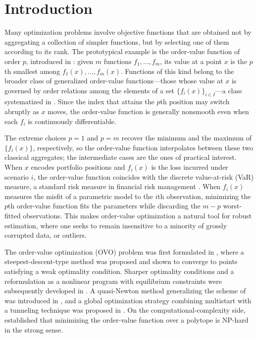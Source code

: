 \documentclass[11pt]{article}
\begin{document}
\section{Introduction} \label{sec:intro}

Many optimization problems involve objective functions that are obtained not
by aggregating a collection of simpler functions, but by selecting one of them
according to its rank. The prototypical example is the order-value function of
order $p$, introduced in \cite{dunder1,dunder2}: given $m$ functions
$f_1,\dots,f_m$, its value at a point $x$ is the $p$th smallest among
$f_1(x),\dots,f_m(x)$. Functions of this kind belong to the broader class of
generalized order-value functions---those whose value at $x$ is governed by
order relations among the elements of a set $\{f_i(x)\}_{i\in I}$---a class
systematized in \cite{mtop}. Since the index that attains the $p$th position
may switch abruptly as $x$ moves, the order-value function is generally
nonsmooth even when each $f_i$ is continuously differentiable.

The extreme choices $p=1$ and $p=m$ recover the minimum and the maximum of
$\{f_i(x)\}$, respectively, so the order-value function interpolates between
these two classical aggregates; the intermediate cases are the ones of
practical interest. When $x$ encodes portfolio positions and $f_i(x)$ is the
loss incurred under scenario $i$, the order-value function coincides with the
discrete value-at-risk (VaR) measure, a standard risk measure in financial
risk management \cite{jorion}. When $f_i(x)$ measures the misfit of a
parametric model to the $i$th observation, minimizing the $p$th order-value
function fits the parameters while discarding the $m-p$ worst-fitted
observations. This makes order-value optimization a natural tool for robust
estimation, where one seeks to remain insensitive to a minority of grossly
corrupted data, or outliers.

The order-value optimization (OVO) problem was first formulated in
\cite{dunder1}, where a steepest-descent-type method was proposed and shown to
converge to points satisfying a weak optimality condition. Sharper optimality
conditions and a reformulation as a nonlinear program with equilibrium
constraints were subsequently developed in \cite{dunder2}. A quasi-Newton
method generalizing the scheme of \cite{dunder1} was introduced in
\cite{yano1}, and a global optimization strategy combining multistart with a
tunneling technique was proposed in \cite{salva}. On the
computational-complexity side, \cite{jiang} established that minimizing the
order-value function over a polytope is NP-hard in the strong sense.
\end{document}
